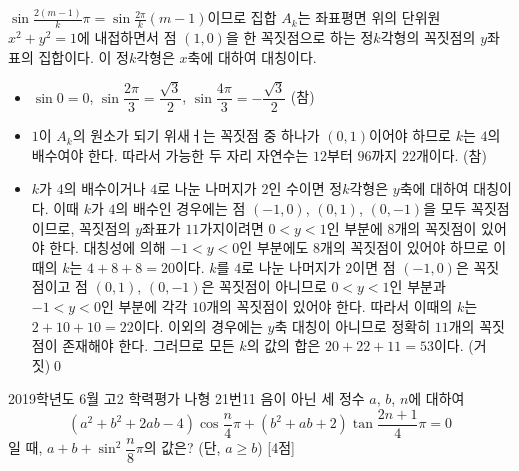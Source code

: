 \documentclass{article}
\begin{document}
\begin{sol}
	$\sin\frac{2(m-1)}{k}\pi=\sin\frac{2\pi}{k}(m-1)$이므로 집합 $A_k$는 좌표평면 위의 단위원 $x^2+y^2=1$에 내접하면서 점 $(1,0)$을 한 꼭짓점으로 하는 정$k$각형의 꼭짓점의 $y$좌표의 집합이다. 이 정$k$각형은 $x$축에 대하여 대칭이다.
	\begin{itemize}
		\item[ㄱ.] $\sin 0=0$, $\sin\dfrac{2\pi}{3}=\dfrac{\sqrt3}{2}$, $\sin\dfrac{4\pi}{3}=-\dfrac{\sqrt3}{2}$ (참)
		\item[ㄴ.] $1$이 $A_k$의 원소가 되기 위새ㅓ는 꼭짓점 중 하나가 $(0,1)$이어야 하므로 $k$는 $4$의 배수여야 한다. 따라서 가능한 두 자리 자연수는 $12$부터 $96$까지 $22$개이다. (참)
		\item[ㄷ.] $k$가 $4$의 배수이거나 $4$로 나눈 나머지가 $2$인 수이면 정$k$각형은 $y$축에 대하여 대칭이다. 이때 $k$가 $4$의 배수인 경우에는 점 $(-1,0)$, $(0,1)$, $(0,-1)$을 모두 꼭짓점이므로, 꼭짓점의 $y$좌표가 $11$가지이려면 $0<y<1$인 부분에 $8$개의 꼭짓점이 있어야 한다. 대칭성에 의해 $-1<y<0$인 부분에도 $8$개의 꼭짓점이 있어야 하므로 이때의 $k$는 $4+8+8=20$이다. $k$를 $4$로 나눈 나머지가 $2$이면 점 $(-1,0)$은 꼭짓점이고 점 $(0,1)$, $(0,-1)$은 꼭짓점이 아니므로 $0<y<1$인 부분과 $-1<y<0$인 부분에 각각 $10$개의 꼭짓점이 있어야 한다. 따라서 이때의 $k$는 $2+10+10=22$이다. 이외의 경우에는 $y$축 대칭이 아니므로 정확히 $11$개의 꼭짓점이 존재해야 한다. 그러므로 모든 $k$의 값의 합은 $20+22+11=53$이다. (거짓)\qed
\end{itemize}
\end{sol}

\newpage
\begin{prob}{2019학년도 6월 고2 학력평가 나형 21번}{11}
	음이 아닌 세 정수 $a$, $b$, $n$에 대하여
	\[
		(a^2+b^2+2ab-4)\cos\frac{n}{4}\pi+(b^2+ab+2)\tan\frac{2n+1}{4}\pi=0
	\]
	일 때, $a+b+\sin^2\dfrac{n}{8}\pi$의 값은? (단, $a\geq b$) [4점]
\end{prob}
\end{document}
